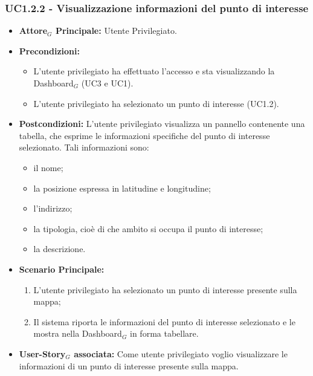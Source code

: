 \documentclass[11pt]{article}
\begin{document}
\begin{justify}
 \subsubsection{\textbf{UC1.2.2 - Visualizzazione informazioni del punto di interesse}}
 \label{UC1.2.2}
 \begin{itemize}
     \item \textbf{Attore$_G$ Principale:} Utente Privilegiato.
     \item \textbf{Precondizioni:}
       \begin{itemize}
            \item L'utente privilegiato ha effettuato l'accesso e sta visualizzando la Dashboard$_G$ (UC3 e UC1).
            \item L'utente privilegiato ha selezionato un punto di interesse (UC1.2).
       \end{itemize}
     \item \textbf{Postcondizioni:} L'utente privilegiato visualizza un pannello contenente una tabella, che esprime le informazioni specifiche del punto di interesse selezionato. Tali informazioni sono:
       \begin{itemize}
       \item il nome;
       \item la posizione espressa in latitudine e longitudine;
       \item l'indirizzo;
       \item la tipologia, cioè di che ambito si occupa il punto di interesse;
       \item la descrizione.
       \end{itemize}
     \item \textbf{Scenario Principale:}
        \begin{enumerate}
          \item L'utente privilegiato ha selezionato un punto di interesse presente sulla mappa;
            \item Il sistema riporta le informazioni del punto di interesse selezionato e le mostra nella Dashboard$_G$ in forma tabellare.
        \end{enumerate}
     \item \textbf{User-Story$_G$ associata:} Come utente privilegiato voglio visualizzare le informazioni di un punto di interesse presente sulla mappa. 
 \end{itemize}




\end{justify}
\end{document}

